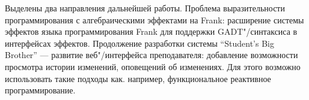 \documentclass [fontsize=14pt, paper=a4, pagesize, DIV=calc]%
{article}
\begin{document}
Выделены два направления дальнейшей работы. Проблема выразительности программирования
с алгебраическими эффектами на Frank: расширение системы эффектов
языка программирования Frank для поддержки GADT"/синтаксиса в интерфейсах эффектов.
Продолжение разработки системы ``Student's Big Brother'' --- развитие веб"/интерфейса
преподавателя: добавление возможности просмотра истории изменений, оповещений об изменениях.
Для этого возможно использовать такие подходы как. например, функциональное
реактивное программирование.

\printbibliography[%
    heading=bibintoc%
    ,title=Библиография %
]
\end{document}
